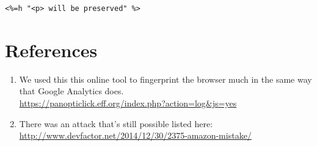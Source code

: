 \documentclass[12pt]{article}
\begin{document}
\begin{lstlisting}
<%=h "<p> will be preserved" %>
\end{lstlisting}




\section{References}\label{references}
\begin{enumerate}
\item We used this this online tool to fingerprint the browser much in the same way that Google Analytics does.\\ \url{https://panopticlick.eff.org/index.php?action=log&js=yes}

\item There was an attack that's still possible listed here: \url{http://www.devfactor.net/2014/12/30/2375-amazon-mistake/}
\end{enumerate}
\end{document}
